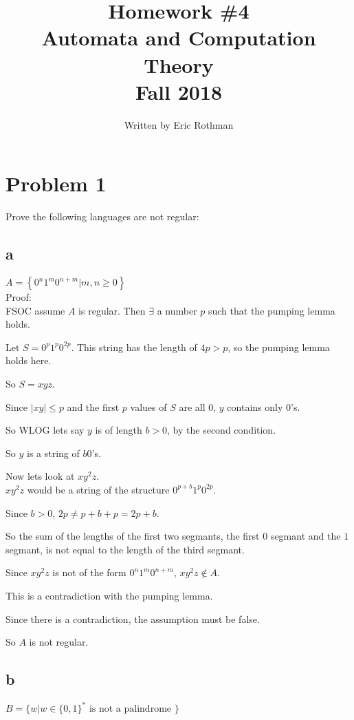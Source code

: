 \documentclass[letterpaper, 11pt]{article}
\begin{document}
\title{Homework \#4 \\ Automata and Computation Theory \\Fall 2018}
\author{Written by Eric Rothman}

\maketitle

\section*{Problem 1}
Prove the following languages are not regular:
\subsection*{a}
$A = \left\{ 0 ^ { n } 1 ^ { m } 0 ^ { n + m } | m , n \geq 0 \right\}$\\

Proof:\\

FSOC assume $A$ is regular.
Then $\exists$ a number $p$ such that the pumping lemma holds.

Let $S = 0^p1^p0^{2p}$.
This string has the length of $4p > p$, so the pumping lemma holds here.

So $S = xyz$.

Since $|xy| \leq p$ and the first $p$ values of $S$ are all $0$, $y$ contains only $0$'s.

So WLOG lets say $y$ is of length $b > 0$, by the second condition.

So $y$ is a string of $b 0$'s.

Now lets look at $xy^2z$.\\

$xy^2z$ would be a string of the structure $0^{p+b}1^p0^{2p}$.

Since $b > 0$, $2p \neq p+b+p = 2p+b$.

So the sum of the lengths of the first two segmants, the first $0$ segmant and the $1$ segmant, is not equal to the length of the third segmant.

Since $xy^2z$ is not of the form $0^n1^m0^{n+m}$, $xy^2z \notin A$.

This is a contradiction with the pumping lemma.

Since there is a contradiction, the assumption must be false.

So $A$ is not regular.

\subsection*{b}
$B = \{ w | w \in \{ 0,1 \} ^ { * } \text { is not a palindrome } \}$
\end{document}
